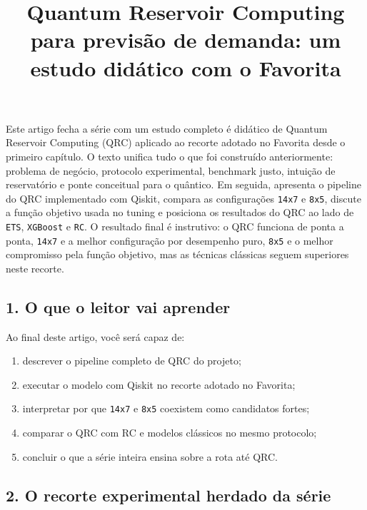\documentclass[12pt]{article}
\title{Quantum Reservoir Computing para previsão de demanda: um estudo didático com o Favorita}
\author{}
\providecommand{\tightlist}{%
          \setlength{\itemsep}{0pt}\setlength{\parskip}{0pt}}
\begin{document}
        \maketitle

        \begin{resumo}
        Este artigo fecha a série com um estudo completo é didático de Quantum Reservoir Computing (QRC) aplicado ao recorte adotado no Favorita desde o primeiro capítulo. O texto unifica tudo o que foi construído anteriormente: problema de negócio, protocolo experimental, benchmark justo, intuição de reservatório e ponte conceitual para o quântico. Em seguida, apresenta o pipeline do QRC implementado com Qiskit, compara as configurações \texttt{14x7} e \texttt{8x5}, discute a função objetivo usada no tuning e posiciona os resultados do QRC ao lado de \texttt{ETS}, \texttt{XGBoost} e \texttt{RC}. O resultado final é instrutivo: o QRC funciona de ponta a ponta, \texttt{14x7} e a melhor configuração por desempenho puro, \texttt{8x5} e o melhor compromisso pela função objetivo, mas as técnicas clássicas seguem superiores neste recorte.
        \end{resumo}

        \subsection{1. O que o leitor vai aprender}\label{1-o-que-o-leitor-vai-aprender}

Ao final deste artigo, você será capaz de:

\begin{enumerate}
\def\labelenumi{\arabic{enumi}.}
\tightlist
\item
  descrever o pipeline completo de QRC do projeto;
\item
  executar o modelo com Qiskit no recorte adotado no Favorita;
\item
  interpretar por que \texttt{14x7} e \texttt{8x5} coexistem como candidatos fortes;
\item
  comparar o QRC com RC e modelos clássicos no mesmo protocolo;
\item
  concluir o que a série inteira ensina sobre a rota até QRC.
\end{enumerate}

\subsection{2. O recorte experimental herdado da série}\label{2-o-recorte-experimental-herdado-da-suxe9rie}
\end{document}
